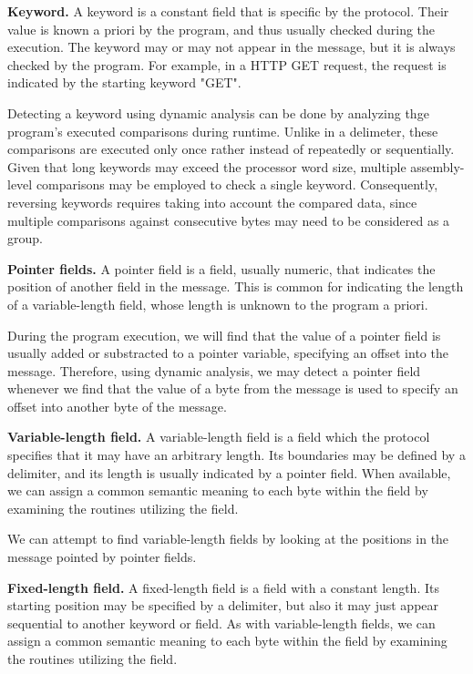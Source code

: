 \documentclass[conference]{IEEEtran}
\begin{document}
\textbf{Keyword.} A keyword is a constant field that is specific by the protocol.
Their value is known a priori by the program, and thus usually checked during the execution.
The keyword may or may not appear in the message, but it is always checked by the program.
For example, in a HTTP GET request, the request is indicated by the starting keyword "GET".

Detecting a keyword using dynamic analysis can be done by analyzing thge
program's executed comparisons during runtime. Unlike in a delimeter, these
comparisons are executed only once rather instead of repeatedly or
sequentially. Given that long keywords may exceed the processor word size,
multiple assembly-level comparisons may be employed to check a single keyword.
Consequently, reversing keywords requires taking into account the compared
data, since multiple comparisons against consecutive bytes may need to be
considered as a group.

\textbf{Pointer fields.} A pointer field is a field, usually numeric, that indicates the
position of another field in the message. This is common for indicating the length of a variable-length
field, whose length is unknown to the program a priori.

During the program execution, we will find that the value of a pointer field
is usually added or substracted to a pointer variable, specifying an offset
into the message. Therefore, using dynamic analysis, we may detect a pointer
field whenever we find that the value of a byte from the message is used to
specify an offset into another byte of the message.

\textbf{Variable-length field.} A variable-length field is a field which the protocol specifies
that it may have an arbitrary length. Its boundaries may be defined by a delimiter, and its length
is usually indicated by a pointer field.
When available, we can assign a common semantic meaning to each byte within the field by
examining the routines utilizing the field.

We can attempt to find variable-length fields by looking at the positions in
the message pointed by pointer fields.

\textbf{Fixed-length field.} A fixed-length field is a field with a constant length. Its starting
position may be specified by a delimiter, but also it may just appear sequential to another keyword
or field.
As with variable-length fields, we can assign a common semantic meaning to each byte within the field by
examining the routines utilizing the field.
\end{document}
